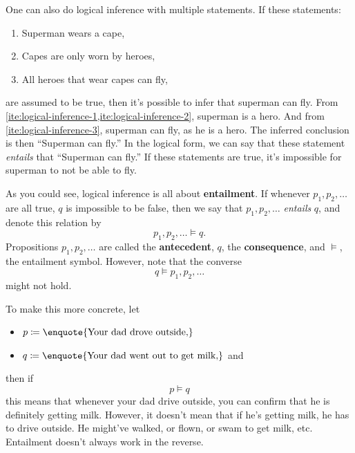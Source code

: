 One can also do logical inference with multiple statements. If these statements:
\begin{enumerate}[noitemsep]
  \item\label{ite:logical-inference-1} Superman wears a cape,
  \item\label{ite:logical-inference-2} Capes are only worn by heroes,
  \item\label{ite:logical-inference-3} All heroes that wear capes can fly,
\end{enumerate}
are assumed to be true, then it's possible to infer that superman can fly. From \cref{ite:logical-inference-1,ite:logical-inference-2}, superman is a hero. And from \cref{ite:logical-inference-3}, superman can fly, as he is a hero. The inferred conclusion is then \enquote{Superman can fly.} In the logical form, we can say that these statement \emph{entails} that \enquote{Superman can fly.} If these statements are true, it's impossible for superman to not be able to fly.

As you could see, logical inference is all about \textbf{entailment}. If whenever \(p_1, p_2, \dots\) are all true, \(q\) is impossible to be false, then we say that \(p_1, p_2, \dots\) \emph{entails} \(q\), and denote this relation by
\begin{equation}
  p_1, p_2, \dotsc \models q.
\end{equation}
Propositions \(p_1, p_2, \dots\) are called the \textbf{antecedent}, \(q\), the \textbf{consequence}, and \(\models\), the entailment symbol. However, note that the converse
\begin{equation}
  q \models p_1, p_2, \dots
\end{equation}
might not hold.

To make this more concrete, let
\begin{itemize}[noitemsep]
  \item \(p \coloneqq \textrm{\enquote{Your dad drove outside,}}\)
  \item \(q \coloneqq \textrm{\enquote{Your dad went out to get milk,}}\) and
\end{itemize}
then if
\begin{equation}
  p \models q
\end{equation}
this means that whenever your dad drive outside, you can confirm that he is definitely getting milk. However, it doesn't mean that if he's getting milk, he has to drive outside. He might've walked, or flown, or swam to get milk, etc. Entailment doesn't always work in the reverse.


